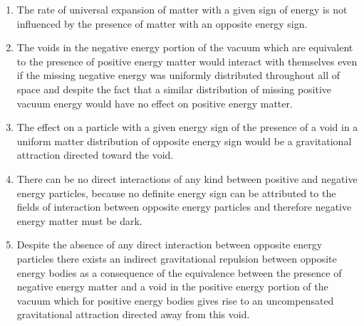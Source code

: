 \documentclass[notitlepage,12pt]{report}
\begin{document}
\begin{enumerate}
\item The rate of universal expansion of matter with a given sign of energy is not influenced by the presence of matter with an opposite energy sign.

\item The voids in the negative energy portion of the vacuum which are equivalent to the presence of positive energy matter would interact with themselves even if the missing negative energy was uniformly distributed throughout all of space and despite the fact that a similar distribution of missing positive vacuum energy would have no effect on positive energy matter.

\item The effect on a particle with a given energy sign of the presence of a void in a uniform matter distribution of opposite energy sign would be a gravitational attraction directed toward the void.

\item There can be no direct interactions of any kind between positive and negative energy particles, because no definite energy sign can be attributed to the fields of interaction between opposite energy particles and therefore negative energy matter must be dark.

\item Despite the absence of any direct interaction between opposite energy particles there exists an indirect gravitational repulsion between opposite energy bodies as a consequence of the equivalence between the presence of negative energy matter and a void in the positive energy portion of the vacuum which for positive energy bodies gives rise to an uncompensated gravitational attraction directed away from this void.


\end{enumerate}
\end{document}
